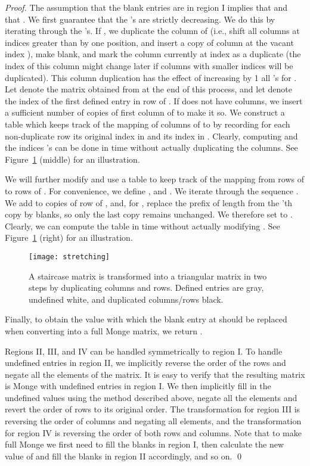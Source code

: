 \documentclass{llncs}
\begin{document}
\begin{proof}
The assumption that the blank entries are in region I implies that  and that . 
We first guarantee that the 's are strictly decreasing. We do this by iterating through the 's. If , we duplicate the column  of  (i.e., shift all columns at indices greater than  by one position, and insert a copy of column  at the vacant index ), make  blank, and mark the column currently at index  as a duplicate (the index of this column might change later if columns with smaller indices will be duplicated). This column duplication has the effect of increasing by 1 all 's for . Let  denote the matrix obtained from  at the end of this process, and let  denote the index of the first defined entry in row  of . If  does not have  columns, we insert a sufficient number of copies of first column of  to make it so. 
We construct a table  which keeps track of the mapping of columns of  to  by recording for each non-duplicate row its original index in  and its index in . Clearly, computing  and the indices 's can be done in  time without actually duplicating the columns. See Figure~\ref{fig:stretch} (middle) for an illustration.

We will further modify  and 
 use a table  to keep track of the mapping from rows of  to rows of . 
For convenience, we define , and . We iterate through the sequence . 
We add to   copies of row  of , and, for , replace the prefix of length  from the 'th copy by blanks, so only the last copy remains unchanged. We therefore set  to . Clearly, we can compute the table  in  time without actually modifying .
See Figure~\ref{fig:stretch} (right) for an illustration.

\begin{figure}[h!]
\centering
   \texttt{[image: stretching]}
   \caption{
   A staircase matrix  is transformed into a triangular matrix  in two steps by duplicating columns and rows. Defined entries
   are gray, undefined white, and duplicated columns/rows black.\label{fig:stretch}}
 \end{figure}

Finally, to obtain the value with which the blank entry at  should be replaced when converting  into a full Monge matrix, we return .

Regions II, III, and IV can be handled symmetrically to region I. To handle undefined entries in region II, we 
implicitly reverse the order of the rows and negate all the elements of the matrix. It is easy to verify that the resulting matrix is Monge with undefined entries in region I. We then implicitly fill in the undefined values using the method described above, negate all the elements and revert the order of rows to its original order. The transformation for region III is reversing the order of columns and negating all elements, and the transformation for region IV is reversing the order of both rows and columns.
Note that to make 
full Monge we first need to fill the blanks in region I, then calculate the new value of 
and fill the blanks in region II accordingly, and so on.
\qed \end{proof}
\end{document}

